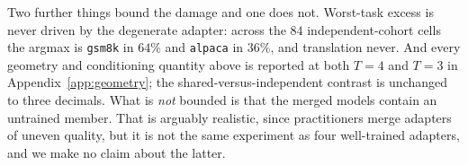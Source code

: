 Two further things bound the damage and one does not. Worst-task excess is never
driven by the degenerate adapter: across the $84$ independent-cohort cells the
argmax is \texttt{gsm8k} in $64\%$ and \texttt{alpaca} in $36\%$, and
translation never. And every geometry and conditioning quantity above is
reported at both $T=4$ and $T=3$ in Appendix~\ref{app:geometry}; the
shared-versus-independent contrast is unchanged to three decimals. What is
\emph{not} bounded is that the merged models contain an untrained member. That
is arguably realistic, since practitioners merge adapters of uneven quality,
but it is not the same experiment as four well-trained adapters, and we make
no claim about the latter.
